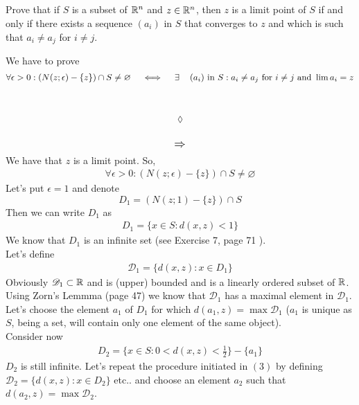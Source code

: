 \subsection{}
\begin{tcolorbox}
Prove that if $S$ is a subset of $\mathbb{R}^n$ and $z \in \mathbb{R}^n$, then $z$ is a limit point of $S$ if and only if there exists a sequence $(a_i)$ in $S$ that converges to $z$ and which is such that $a_i\neq a_j$ for $i\neq j$.
\end{tcolorbox}
We have to prove
$$\forall \epsilon >0: \left(N(z;\epsilon)-\{z\}\right)\cap S\neq\varnothing\quad \iff\quad \exists\, \quad(a_i)\text{ in } S: a_i\neq a_j \text{ for } i\neq j \text{ and } \lim a_i= z$$\\\\
$$\lozenge$$\\
$$\mathbf{\mathlarger{\implies}}$$
We have that $z$ is a limit point. So, 
\begin{align}
\forall \epsilon >0: \left(N(z;\epsilon)-\{z\}\right)\cap S\neq\varnothing
\end{align}
Let's put $\epsilon =1$ and denote 
$$D_1=\left(N(z;1)-\{z\}\right)\cap S$$
Then we can write $D_1$ as
 \begin{align}
 D_1=\{ x\in S: d(x,z)<1\}
 \end{align}
 We know that $D_1$ is an infinite set (see Exercise 7, page 71 ).\\
 Let's define 
 \begin{align}
 \mathscr{D}_1=\{d(x,z): x\in D_1\}
 \end{align}
 Obviously $\mathscr{D}_1\subset \mathbb{R}$ and is (upper) bounded and is a linearly ordered subset of $\mathbb{R}$. Using Zorn's Lemmma (page 47) we know that $\mathscr{D}_1$ has a maximal element in $\mathscr{D}_1$. Let's choose the element $a_1$ of $D_1$ for which $d(a_1,z)=\max \mathscr{D}_1$ ($a_1$ is unique as $S$, being a set, will contain only one element of the same object).\\
 Consider now 
 \begin{align}
 D_2=\{ x\in S: 0<d(x,z)<\frac{1}{2}\}-\{a_1\}
 \end{align}
 $D_2$ is still infinite. Let's repeat the procedure initiated in $(3)$ by defining $ \mathscr{D}_2=\{d(x,z): x\in D_2\}$ etc.. and choose an element $a_2$ such that $d(a_2,z)=\max \mathscr{D}_2$.\\
